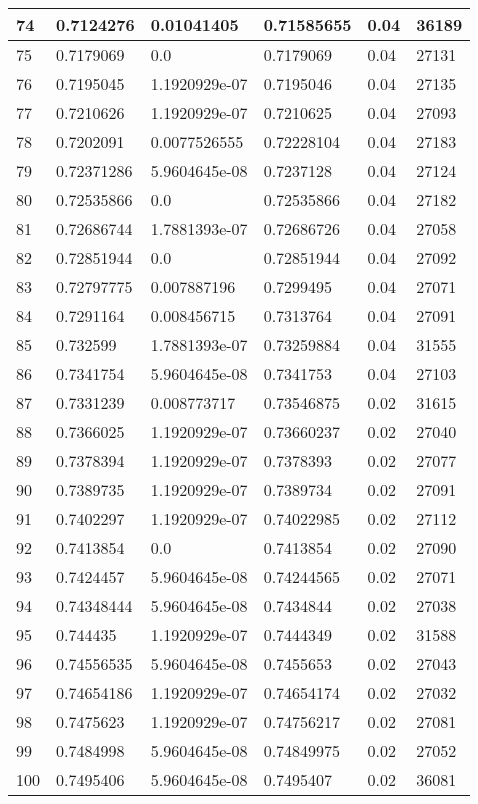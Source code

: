 \begin{longtable}{|l|l|l|l|l|l|}
74 & 0.7124276 & 0.01041405 & 0.71585655 & 0.04 & 36189 \\ \hline 
75 & 0.7179069 & 0.0 & 0.7179069 & 0.04 & 27131 \\ \hline 
76 & 0.7195045 & 1.1920929e-07 & 0.7195046 & 0.04 & 27135 \\ \hline 
77 & 0.7210626 & 1.1920929e-07 & 0.7210625 & 0.04 & 27093 \\ \hline 
78 & 0.7202091 & 0.0077526555 & 0.72228104 & 0.04 & 27183 \\ \hline 
79 & 0.72371286 & 5.9604645e-08 & 0.7237128 & 0.04 & 27124 \\ \hline 
80 & 0.72535866 & 0.0 & 0.72535866 & 0.04 & 27182 \\ \hline 
81 & 0.72686744 & 1.7881393e-07 & 0.72686726 & 0.04 & 27058 \\ \hline 
82 & 0.72851944 & 0.0 & 0.72851944 & 0.04 & 27092 \\ \hline 
83 & 0.72797775 & 0.007887196 & 0.7299495 & 0.04 & 27071 \\ \hline 
84 & 0.7291164 & 0.008456715 & 0.7313764 & 0.04 & 27091 \\ \hline 
85 & 0.732599 & 1.7881393e-07 & 0.73259884 & 0.04 & 31555 \\ \hline 
86 & 0.7341754 & 5.9604645e-08 & 0.7341753 & 0.04 & 27103 \\ \hline 
87 & 0.7331239 & 0.008773717 & 0.73546875 & 0.02 & 31615 \\ \hline 
88 & 0.7366025 & 1.1920929e-07 & 0.73660237 & 0.02 & 27040 \\ \hline 
89 & 0.7378394 & 1.1920929e-07 & 0.7378393 & 0.02 & 27077 \\ \hline 
90 & 0.7389735 & 1.1920929e-07 & 0.7389734 & 0.02 & 27091 \\ \hline 
91 & 0.7402297 & 1.1920929e-07 & 0.74022985 & 0.02 & 27112 \\ \hline 
92 & 0.7413854 & 0.0 & 0.7413854 & 0.02 & 27090 \\ \hline 
93 & 0.7424457 & 5.9604645e-08 & 0.74244565 & 0.02 & 27071 \\ \hline 
94 & 0.74348444 & 5.9604645e-08 & 0.7434844 & 0.02 & 27038 \\ \hline 
95 & 0.744435 & 1.1920929e-07 & 0.7444349 & 0.02 & 31588 \\ \hline 
96 & 0.74556535 & 5.9604645e-08 & 0.7455653 & 0.02 & 27043 \\ \hline 
97 & 0.74654186 & 1.1920929e-07 & 0.74654174 & 0.02 & 27032 \\ \hline 
98 & 0.7475623 & 1.1920929e-07 & 0.74756217 & 0.02 & 27081 \\ \hline 
99 & 0.7484998 & 5.9604645e-08 & 0.74849975 & 0.02 & 27052 \\ \hline 
100 & 0.7495406 & 5.9604645e-08 & 0.7495407 & 0.02 & 36081 \\ \hline 
\end{longtable}